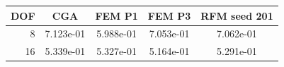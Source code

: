 \begin{tabular}{rcccc}
\toprule
DOF & CGA & FEM P1 & FEM P3 & RFM seed 201 \\
\midrule
8 & 7.123e-01 & 5.988e-01 & 7.053e-01 & 7.062e-01 \\
16 & 5.339e-01 & 5.327e-01 & 5.164e-01 & 5.291e-01 \\
\bottomrule
\end{tabular}
